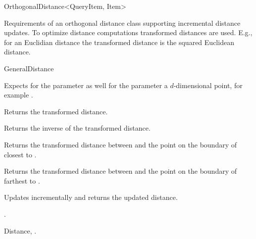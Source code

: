 

\begin{ccRefConcept}{OrthogonalDistance<QueryItem, Item>}


\ccDefinition
  
Requirements of an orthogonal distance class supporting incremental distance updates.
To optimize distance computations transformed distances are used. 
E.g., for an Euclidian distance the transformed distance is the squared Euclidean distance.

\ccRefines

GeneralDistance

\ccParameters

Expects for the parameter  as well for the parameter 
a $d$-dimensional point, for example .

\ccTypes

\ccCreation
{}  %


 {Returns the transformed distance.}

 {Returns the inverse of the transformed distance.}


{Returns the transformed distance between  and
the point on the boundary of  closest to .}

{Returns the transformed distance between  and
the point on the boundary of  farthest to .}

 {Updates 
 incrementally and returns the updated distance.}

\ccHasModels

.

\ccSeeAlso

Distance,
.

\end{ccRefConcept}


